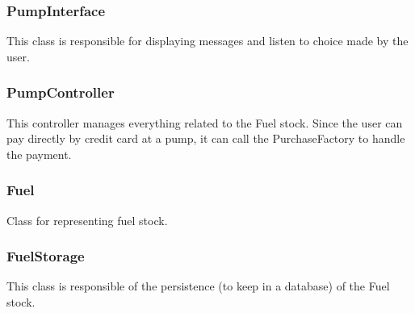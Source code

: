 \documentclass[11pt, a4paper]{article}
\begin{document}
\subsubsection*{PumpInterface}
This class is responsible for displaying messages and listen to choice made by the user.

\subsubsection*{PumpController}
This controller manages everything related to the Fuel stock. Since the user can pay directly by credit card at a pump, it can call the PurchaseFactory to handle the payment.

\subsubsection*{Fuel}
Class for representing fuel stock.

\subsubsection*{FuelStorage}
This class is responsible of the persistence (to keep in a database) of the Fuel stock.
\end{document}
